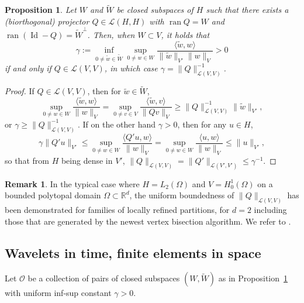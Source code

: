 \documentclass[11pt,a4paper,oneside,english]{amsart}
\numberwithin{equation}{section}
\numberwithin{theorem}{section}
\newtheorem{prop}[theorem]{Proposition}
\theoremstyle{definition}
\newtheorem{remark}[theorem]{Remark}
\newcommand{\R}{\mathbb{R}}
\newcommand{\la}{\langle}
\newcommand{\ra}{\rangle}
\DeclareMathOperator*{\Id}{Id}
\newcommand{\cL}{\mathcal L}
\newcommand{\jw}[1]{{\color{red}{JW: #1}}}
\DeclareMathOperator*{\ran}{ran}
\begin{document}
\begin{prop} \label{prop:space-infsup}
  Let $W$ and $\tilde W$ be closed subspaces of $H$ such that there exists a
  (biorthogonal) projector $Q \in \cL(H,H)$ with $\ran Q=W$ and $\ran (\Id -Q)={\tilde W}^\perp$. 
  Then, when $W \subset V$, it holds that 
  \[
    \gamma:=\inf_{0 \neq \tilde w \in \tilde W}\sup_{0 \neq w \in W}\frac{\la \tilde w,w\ra}{\|\tilde w\|_{V'}\|w\|_V}>0
  \]
  if and only if $Q \in \cL(V,V)$, in which case $\gamma=\|Q\|_{\cL(V,V)}^{-1}$.
\end{prop}
\begin{proof} \jw{Dit ben ik nog niet nagegaan.} If $Q\in \cL(V,V)$, then for $\tilde w \in \tilde W$,
$$
\sup_{0 \neq w \in W}\frac{\la \tilde w,w\ra}{\|w\|_V}=\sup_{0 \neq v \in V}\frac{\la \tilde w, v\ra}{\|Qv\|_V}
\geq \|Q\|_{\cL(V,V)}^{-1} \|\tilde w\|_{V'},
$$
or $\gamma \geq \|Q\|_{\cL(V,V)}^{-1}$. If on the other hand $\gamma>0$, then for any $u \in H$,
$$
\gamma \|Q' u\|_{V'} \leq \sup_{0 \neq w \in W}\frac{\la Q'u,w\ra}{\|w\|_V} =
 \sup_{0 \neq w \in W}\frac{\la u,w\ra}{\|w\|_V} \leq \|u\|_{V'},
 $$
so that from $H$ being dense in $V'$, $\|Q\|_{\cL(V,V)}=\|Q'\|_{\cL(V',V')}\leq \gamma^{-1}$.
\end{proof}
\begin{remark}
  In the typical case where $H = L_2(\Omega)$ and $V = H_0^1(\Omega)$ on a bounded
  polytopal domain $\Omega \subset \R^d$, the uniform boundedness of $\|Q\|_{\cL(V,V)}$
  has been demonstrated for families of locally refined partitions, for $d=2$
  including those that are generated by the newest vertex bisection algorithm.
  We refer to \cite{Carstensen2001a,Gaspoz2016}. \jw{Misschien is het ``$H^1$-stability
  of $L^2$-projection" inmiddels wel uitgespeeld. ik vond ook een werk uit
  2014 van de groep van Dirk, en dit werkte voor elke dimensie, maar enkel op
  vreemde fin.elts. Ook een werk uit 2019 van Gaspoz, Heine, Siebert waar het
  2d-NVB geval wordt bekeken voor Lagrange-fin elts tot graad 4.}
\end{remark}

\subsection{Wavelets in time, finite elements in space}
\jw{Willen we hier $\tilde Y^\delta$ houden ookal is hij gewoon $=Y^\delta$?}
Let ${\mathcal O}$ be a collection of pairs of closed subspaces $(W,\tilde{W})$
as in Proposition~\ref{prop:space-infsup} with uniform inf-sup constant $\gamma>0$.
\end{document}
